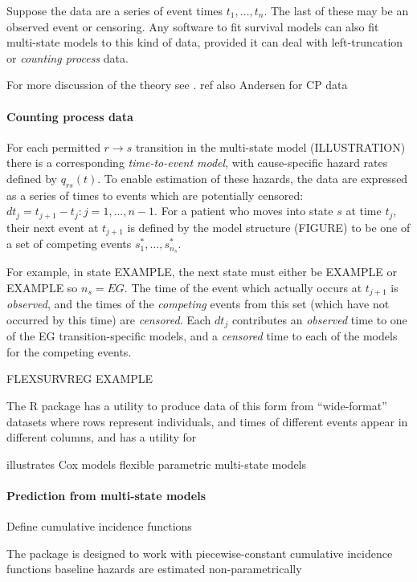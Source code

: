 \documentclass[nojss,nofooter]{jss}
\begin{document}
Suppose the data are a series of event times $t_{1},\dots, t_{n}$.
The last of these may be an observed event or censoring.  Any software
to fit survival models can also fit multi-state models to this kind of
data, provided it can deal with left-truncation or \emph{counting
  process} data.

For more discussion of the theory see \citet{putter:mstate}. ref also
Andersen for CP data

\paragraph{Counting process data}
For each permitted $r \rightarrow s$ transition in the multi-state
model (ILLUSTRATION) there is a corresponding \emph{time-to-event
  model}, with cause-specific hazard rates defined by $q_{rs}(t)$. To
enable estimation of these hazards, the data are expressed as a series
of times to events which are potentially censored: $dt_{j} = t_{j+1} -
t_{j}: j = 1,\ldots,n-1$. For a patient who moves into state $s$ at
time $t_{j}$, their next event at $t_{j+1}$ is defined by the model
structure (FIGURE) to be one of a set of competing events
$s^*_1,\ldots,s^*_{n_s}$.

For example, in state EXAMPLE, the next state must either be EXAMPLE
or EXAMPLE so $n_s=EG$.  The time of the event which actually occurs
at $t_{j+1}$ is \emph{observed}, and the times of the \emph{competing}
events from this set (which have not occurred by this time) are
\emph{censored}.  Each $dt_{j}$ contributes an \emph{observed} time to
one of the EG transition-specific models, and a \emph{censored} time
to each of the models for the competing events.

FLEXSURVREG EXAMPLE

The  R package \citep{mstate:cmpb,mstate:jss} has a
utility  to produce data of this form from
``wide-format'' datasets where rows represent individuals, and times
of different events appear in different columns, and  has
a utility  for 

illustrates Cox models
flexible parametric multi-state models 

\paragraph{Prediction from multi-state models}

Define cumulative incidence functions

The  package is designed to work with 
piecewise-constant cumulative incidence functions
baseline hazards are estimated non-parametrically 
\citep{mstate:cmpb,mstate:jss} 
\end{document}
